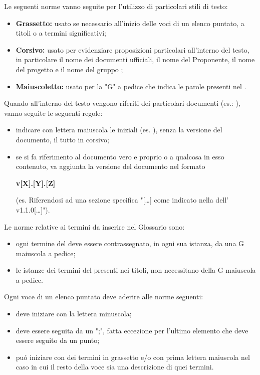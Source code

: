         Le seguenti norme vanno seguite per l'utilizzo di particolari stili di testo:
        \begin{itemize}
          \item \textbf{Grassetto:} usato se necessario all'inizio delle voci di un elenco puntato, a titoli o a termini significativi;
          \item \textbf{Corsivo:} usato per evidenziare proposizioni particolari all'interno del testo, in particolare il nome dei documenti ufficiali, il nome del Proponente, il nome del progetto \textit{\NomeProgetto} e il nome del gruppo \textit{\Gruppo{}};
          \item \textbf{Maiuscoletto:} usato per la "G" a pedice che indica le parole presenti nel \Glossario{}.
        \end{itemize}
        Quando all'interno del testo vengono riferiti dei particolari documenti (es.: \AdR), vanno seguite le seguenti regole:
        \begin{itemize}
          \item indicare con lettera maiuscola le iniziali (es. \AdR), senza la versione del documento, il tutto in corsivo;
          \item se si fa riferimento al documento vero e proprio o a qualcosa in esso contenuto, va aggiunta la versione del documento nel formato
          \begin{center}
              \textbf{v[X].[Y].[Z]}
          \end{center}
          (es. Riferendosi ad una sezione specifica "[\dots{}] come indicato nella  dell'\AdR{} v1.1.0[\dots{}]").
        \end{itemize}
      	Le norme relative ai termini da inserire nel Glossario sono:
        \begin{itemize}
          \item ogni termine del \Glossario{} deve essere contrassegnato, in ogni sua istanza, da una G maiuscola a pedice;
          \item le istanze dei termini del \Glossario{} presenti nei titoli, non necessitano della G maiuscola a pedice.
        \end{itemize}

          Ogni voce di un elenco puntato deve aderire alle norme seguenti:
          \begin{itemize}
            \item deve iniziare con la lettera minuscola;
            \item deve essere seguita da un ";", fatta eccezione per l'ultimo elemento che deve essere seguito da un punto;
            \item puó iniziare con dei termini in grassetto e/o con prima lettera maiuscola nel caso in cui il resto della voce sia una descrizione di quei termini.
          \end{itemize}


